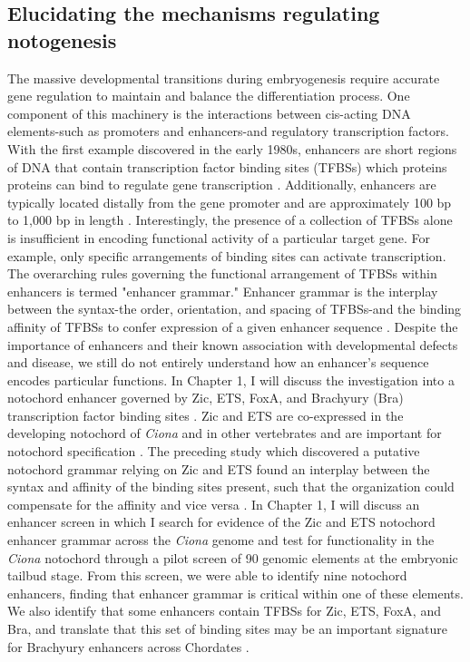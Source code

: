 \begin{dissertationintroduction}
    \section{Elucidating the mechanisms regulating notogenesis}

    The massive developmental transitions during embryogenesis require accurate gene regulation to maintain and balance the differentiation process. One component of this machinery is the interactions between cis-acting DNA elements-such as promoters and enhancers-and regulatory transcription factors. With the first example discovered in the early 1980s, enhancers are short regions of DNA that contain transcription factor binding sites (TFBSs) which proteins proteins can bind to regulate gene transcription \cite{khoury1983, kvon2021, levine2010}. Additionally, enhancers are typically located distally from the gene promoter and are approximately 100 bp to 1,000 bp in length \cite{khoury1983, levine2010}. Interestingly, the presence of a collection of TFBSs alone is insufficient in encoding functional activity of a particular target gene. For example, only specific arrangements of binding sites can activate transcription. The overarching rules governing the functional arrangement of TFBSs within enhancers is termed "enhancer grammar." Enhancer grammar is the interplay between the syntax-the order, orientation, and spacing of TFBSs-and the binding affinity of TFBSs to confer expression of a given enhancer sequence \cite{arnone1997, jindal2021}. Despite the importance of enhancers and their known association with developmental defects and disease, we still do not entirely understand how an enhancer’s sequence encodes particular functions. In Chapter 1, I will discuss the investigation into a notochord enhancer governed by Zic, ETS, FoxA, and Brachyury (Bra) transcription factor binding sites \cite{farley2016, song2022}. Zic and ETS are co-expressed in the developing notochord of \textit{Ciona} and in other vertebrates and are important for notochord specification \cite{dykes2018,matsumoto2007a}. The preceding study which discovered a putative notochord grammar relying on Zic and ETS found an interplay between the syntax and affinity of the binding sites present, such that the organization could compensate for the affinity and vice versa \cite{farley2016}. In Chapter 1, I will discuss an enhancer screen in which I search for evidence of the Zic and ETS notochord enhancer grammar across the \textit{Ciona} genome and test for functionality in the \textit{Ciona} notochord through a pilot screen of 90 genomic elements at the embryonic tailbud stage. From this screen, we were able to identify nine notochord enhancers, finding that enhancer grammar is critical within one of these elements. We also identify that some enhancers contain TFBSs for Zic, ETS, FoxA, and Bra, and translate that this set of binding sites may be an important signature for Brachyury enhancers across Chordates \cite{song2022}. 
    

\end{dissertationintroduction}
